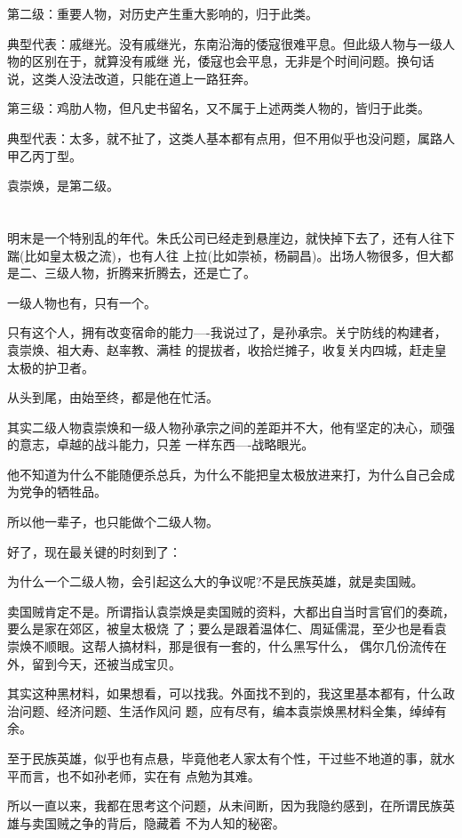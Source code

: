 \documentclass[11pt,a4paper,onecolumn]{article}
\begin{document}
第二级：重要人物，对历史产生重大影响的，归于此类。

典型代表：戚继光。没有戚继光，东南沿海的倭寇很难平息。但此级人物与一级人物的区别在于，就算没有戚继
光，倭寇也会平息，无非是个时间问题。换句话说，这类人没法改道，只能在道上一路狂奔。

第三级：鸡肋人物，但凡史书留名，又不属于上述两类人物的，皆归于此类。

典型代表：太多，就不扯了，这类人基本都有点用，但不用似乎也没问题，属路人甲乙丙丁型。

袁崇焕，是第二级。

\section[\thesection]{}

明末是一个特别乱的年代。朱氏公司已经走到悬崖边，就快掉下去了，还有人往下踹(比如皇太极之流)，也有人往
上拉(比如崇祯，杨嗣昌)。出场人物很多，但大都是二、三级人物，折腾来折腾去，还是亡了。

一级人物也有，只有一个。

只有这个人，拥有改变宿命的能力----我说过了，是孙承宗。关宁防线的构建者，袁崇焕、祖大寿、赵率教、满桂
的提拔者，收拾烂摊子，收复关内四城，赶走皇太极的护卫者。

从头到尾，由始至终，都是他在忙活。

其实二级人物袁崇焕和一级人物孙承宗之间的差距并不大，他有坚定的决心，顽强的意志，卓越的战斗能力，只差
一样东西----战略眼光。

他不知道为什么不能随便杀总兵，为什么不能把皇太极放进来打，为什么自己会成为党争的牺牲品。

所以他一辈子，也只能做个二级人物。

好了，现在最关键的时刻到了：

为什么一个二级人物，会引起这么大的争议呢?不是民族英雄，就是卖国贼。

卖国贼肯定不是。所谓指认袁崇焕是卖国贼的资料，大都出自当时言官们的奏疏，要么是家在郊区，被皇太极烧
了；要么是跟着温体仁、周延儒混，至少也是看袁崇焕不顺眼。这帮人搞材料，那是很有一套的，什么黑写什么，
偶尔几份流传在外，留到今天，还被当成宝贝。

其实这种黑材料，如果想看，可以找我。外面找不到的，我这里基本都有，什么政治问题、经济问题、生活作风问
题，应有尽有，编本袁崇焕黑材料全集，绰绰有余。

至于民族英雄，似乎也有点悬，毕竟他老人家太有个性，干过些不地道的事，就水平而言，也不如孙老师，实在有
点勉为其难。

所以一直以来，我都在思考这个问题，从未间断，因为我隐约感到，在所谓民族英雄与卖国贼之争的背后，隐藏着
不为人知的秘密。
\end{document}
